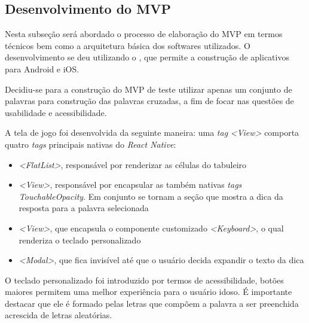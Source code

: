 \subsection{Desenvolvimento do MVP}
Nesta subseção será abordado o processo de elaboração do MVP em termos técnicos bem como a arquitetura básica dos softwares utilizados.
O desenvolvimento se deu utilizando o  \cite{RN}, que permite a construção de aplicativos para Android e iOS.


Decidiu-se para a construção do MVP de teste utilizar apenas um conjunto de palavras para construção das palavras cruzadas, a fim de focar nas questões de usabilidade e acessibilidade.

A tela de jogo foi desenvolvida da seguinte maneira: uma \textit{tag} \textit{<View>} comporta quatro \textit{tags} principais nativas do \textit{React Native}:

\begin{itemize}
    \item \textit{<FlatList>}, responsável por renderizar as células do tabuleiro
    \item \textit{<View>}, responsável por encapsular as também nativas \textit{tags} \textit{TouchableOpacity}. Em conjunto se tornam a seção que mostra a dica da resposta para a palavra selecionada 
    \item \textit{<View>}, que encapsula o componente customizado \textit{<Keyboard>}, o qual renderiza o teclado personalizado
    \item \textit{<Modal>}, que fica invisível até que o usuário decida expandir o texto da dica
\end{itemize}

O teclado personalizado foi introduzido por termos de acessibilidade, botões maiores permitem uma melhor experiência para o usuário idoso. É importante destacar que ele é formado pelas letras que compõem a palavra a ser preenchida acrescida de letras aleatórias.

